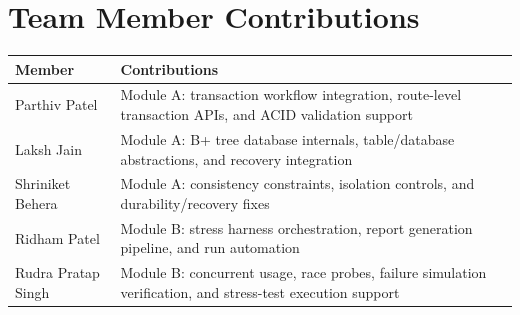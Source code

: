 \documentclass[12pt,a4paper]{article}
\begin{document}
\section*{Team Member Contributions}

\begin{table}[H]
\centering
\begin{tabularx}{\textwidth}{lX}
\hline
\textbf{Member} & \textbf{Contributions} \\
\hline
Parthiv Patel & Module A: transaction workflow integration, route-level transaction APIs, and ACID validation support \\
Laksh Jain & Module A: B+ tree database internals, table/database abstractions, and recovery integration \\
Shriniket Behera & Module A: consistency constraints, isolation controls, and durability/recovery fixes \\
Ridham Patel & Module B: stress harness orchestration, report generation pipeline, and run automation \\
Rudra Pratap Singh & Module B: concurrent usage, race probes, failure simulation verification, and stress-test execution support \\
\hline
\end{tabularx}
\end{table}
\end{document}
